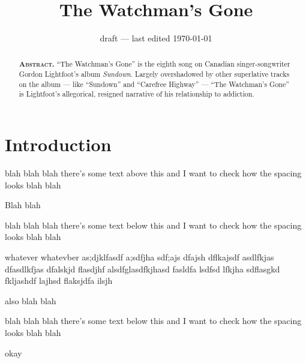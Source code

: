 \documentclass[draft]{article}
\title{The Watchman's Gone}
\author{%
	\authorship{\correspondence Gordon Lightfoot}{Toronto, Ontario, Canada}
}
\date{draft --- last edited \today}
\begin{document}
	\maketitle
	\begin{abstract}\noindent\textbf{\textsc{Abstract.}}
		``The Watchman's Gone'' is the eighth song on Canadian singer-songwriter Gordon Lightfoot's album \emph{Sundown}. Largely overshadowed by other superlative tracks on the album --- like ``Sundown'' and ``Carefree Highway'' --- ``The Watchman's Gone'' is Lightfoot's allegorical, resigned narrative of his relationship to addiction.
    \end{abstract}
    \vspace{-2em}
    {\tableofcontents}
    
	\section{Introduction}\label{section:introduction}
		
		
		blah blah blah there's some text above this and I want to check how the spacing looks blah blah
		
		\begin{bigtheorem}
			Blah blah	
		\end{bigtheorem}
		
		blah blah blah there's some text below this and I want to check how the spacing looks blah blah
		
		\begin{alternate}
			whatever whatevber	 as;djklfasdf a;sdfjha sdf;ajs dfajsh dflkajsdf asdlfkjas dfasdlkfjas dfalskjd flasdjhf alsdfglasdfkjhasd fasldfa lsdfsd lfkjha sdflasgkd fkljashdf lajhsd flaksjdfa ilsjh
		\end{alternate}

		
		\begin{theorem}
			also blah blah	
		\end{theorem}
		
		blah blah blah there's some text below this and I want to check how the spacing looks blah blah
		
		
		\begin{insetalgorithm}[name=yay]
			\item okay	
		\end{insetalgorithm}


	
	\printbibliography[heading=bibintoc]
\end{document}

